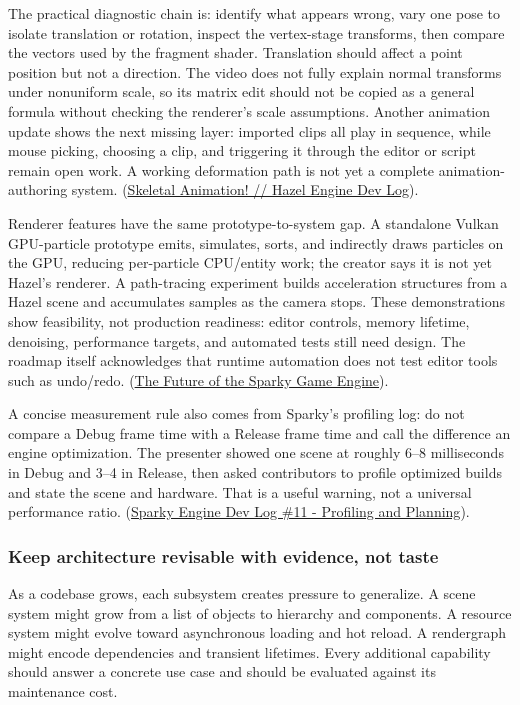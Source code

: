 The practical diagnostic chain is: identify what appears wrong, vary one pose to isolate translation or rotation, inspect the vertex-stage transforms, then compare the vectors used by the fragment shader. Translation should affect a point position but not a direction. The video does not fully explain normal transforms under nonuniform scale, so its matrix edit should not be copied as a general formula without checking the renderer's scale assumptions. Another animation update shows the next missing layer: imported clips all play in sequence, while mouse picking, choosing a clip, and triggering it through the editor or script remain open work. A working deformation path is not yet a complete animation-authoring system. (\href{https://www.youtube.com/watch?v=8-wAi--vW1o&t=4m18s}{Skeletal Animation! // Hazel Engine Dev Log}).

Renderer features have the same prototype-to-system gap. A standalone Vulkan GPU-particle prototype emits, simulates, sorts, and indirectly draws particles on the GPU, reducing per-particle CPU/entity work; the creator says it is not yet Hazel's renderer. A path-tracing experiment builds acceleration structures from a Hazel scene and accumulates samples as the camera stops. These demonstrations show feasibility, not production readiness: editor controls, memory lifetime, denoising, performance targets, and automated tests still need design. The roadmap itself acknowledges that runtime automation does not test editor tools such as undo/redo. (\href{https://www.youtube.com/watch?v=hUFHzuIyK0g&t=6m27s}{The Future of the Sparky Game Engine}).

A concise measurement rule also comes from Sparky's profiling log: do not compare a Debug frame time with a Release frame time and call the difference an engine optimization. The presenter showed one scene at roughly 6--8 milliseconds in Debug and 3--4 in Release, then asked contributors to profile optimized builds and state the scene and hardware. That is a useful warning, not a universal performance ratio. (\href{https://www.youtube.com/watch?v=cimYa67cR-U&t=6m30s}{Sparky Engine Dev Log \#11 - Profiling and Planning}).

\subsubsection{Keep architecture revisable with evidence, not taste}\label{keep-architecture-revisable-with-evidence-not-taste}

As a codebase grows, each subsystem creates pressure to generalize. A scene system might grow from a list of objects to hierarchy and components. A resource system might evolve toward asynchronous loading and hot reload. A rendergraph might encode dependencies and transient lifetimes. Every additional capability should answer a concrete use case and should be evaluated against its maintenance cost.


